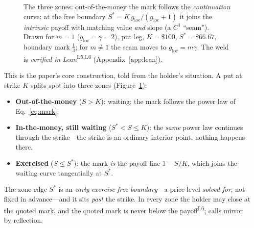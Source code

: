 \documentclass[runningheads]{llncs}
\newcommand{\tfp}{\emph{verified in Lean}}
\begin{document}
\begin{figure}[t]
\centering
{}
\caption{The three zones: out-of-the-money the mark follows the
\emph{continuation} curve; at the free boundary
$S^{\ast}=K\,g_{\mathrm{loc}}/(g_{\mathrm{loc}}+1)$ it joins the \emph{intrinsic}
payoff with matching value \emph{and} slope (a $C^{1}$ ``seam''). Drawn for $m=1$
($g_{\mathrm{loc}}=\gamma=2$), put leg, $K=\$100$, $S^{\ast}=\$66.67$, boundary
mark $\tfrac13$; for $m\neq1$ the seam moves to $g_{\mathrm{loc}}=m\gamma$. The
weld is \tfp{}\textsuperscript{L5,L6} (Appendix~\ref{app:lean}).}
\label{fig:seam}
\end{figure}

This is the paper's core construction, told from the holder's situation. A
put at strike $K$ splits spot into three zones (Figure~\ref{fig:seam}):
\begin{itemize}[leftmargin=1.6em,itemsep=1pt]
  \item \textbf{Out-of-the-money} ($S>K$): waiting; the mark follows the
    power law of Eq.~\eqref{eq:mark}.
  \item \textbf{In-the-money, still waiting} ($S^{\ast}<S\le K$): the
    \emph{same} power law continues through the strike---the strike is an
    ordinary interior point, nothing happens there.
  \item \textbf{Exercised} ($S\le S^{\ast}$): the mark \emph{is} the payoff
    line $1-S/K$, which joins the waiting curve tangentially at $S^{\ast}$.
\end{itemize}
The zone edge $S^{\ast}$ is an \emph{early-exercise free boundary}---a price
level \emph{solved for}, not fixed in advance---and it sits \emph{past} the
strike. In every zone the holder may close at the quoted mark, and the quoted
mark is never below the payoff\textsuperscript{L6}; calls mirror by
reflection.
\end{document}
